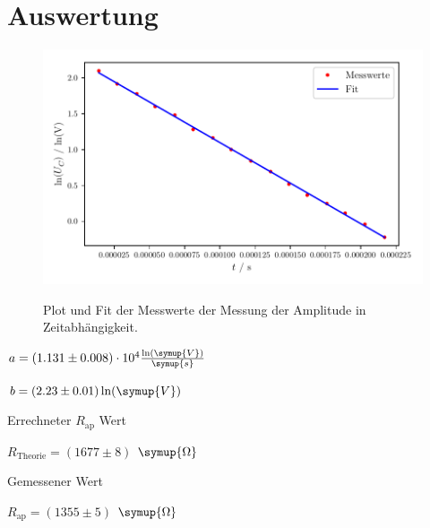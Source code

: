 \section{Auswertung}
\label{sec:Auswertung}



\begin{figure}
    \centering
    \includegraphics{build/plot-amplitude.pdf}
    \label{fig:zeit-amplitude}
    \caption{Plot und Fit der Messwerte der Messung der Amplitude in Zeitabhängigkeit.}
\end{figure}

\begin{center}
    $a = (1.131 \pm 0.008) \cdot 10^{4} \frac{\ln(\symup{V})}{\symup{s}}$

    $b = (2.23 \pm 0.01) \ln(\symup{V})$
\end{center}




Errechneter $R_\text{ap}$ Wert

\begin{center}
    $R_\text{Theorie} = (1677 \pm 8)$ $\symup{\Omega}$ 
\end{center}

Gemessener Wert

\begin{center}
    $R_\text{ap} = (1355 \pm 5)$ $\symup{\Omega}$
\end{center}




